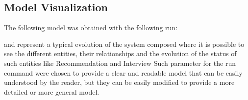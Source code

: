 \subsection{Model Visualization}
The following model was obtained with the following run:

and represent a typical evolution of the system composed where it is possible to see the different entities, their relationships and the evolution of the status of such entities like Recommendation and Interview
Such parameter for the run command were chosen to provide a clear and readable model that can be easily understood by the reader, but they can be easily modified to provide a more detailed or more general model. 

